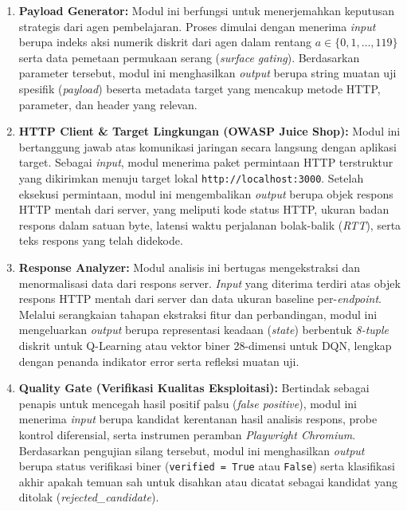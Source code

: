 \begin{enumerate}
\begin{enumerate}
    \item \textbf{Payload Generator:} 
    Modul ini berfungsi untuk menerjemahkan keputusan strategis dari agen pembelajaran. Proses dimulai dengan menerima \textit{input} berupa indeks aksi numerik diskrit dari agen dalam rentang $a \in \{0, 1, \dots, 119\}$ serta data pemetaan permukaan serang (\textit{surface gating}). Berdasarkan parameter tersebut, modul ini menghasilkan \textit{output} berupa string muatan uji spesifik (\textit{payload}) beserta metadata target yang mencakup metode HTTP, parameter, dan header yang relevan.

    \item \textbf{HTTP Client \& Target Lingkungan (OWASP Juice Shop):} 
    Modul ini bertanggung jawab atas komunikasi jaringan secara langsung dengan aplikasi target. Sebagai \textit{input}, modul menerima paket permintaan HTTP terstruktur yang dikirimkan menuju target lokal \texttt{http://localhost:3000}. Setelah eksekusi permintaan, modul ini mengembalikan \textit{output} berupa objek respons HTTP mentah dari server, yang meliputi kode status HTTP, ukuran badan respons dalam satuan byte, latensi waktu perjalanan bolak-balik (\textit{RTT}), serta teks respons yang telah didekode.

    \item \textbf{Response Analyzer:} 
    Modul analisis ini bertugas mengekstraksi dan menormalisasi data dari respons server. \textit{Input} yang diterima terdiri atas objek respons HTTP mentah dari server dan data ukuran baseline per-\textit{endpoint}. Melalui serangkaian tahapan ekstraksi fitur dan perbandingan, modul ini mengeluarkan \textit{output} berupa representasi keadaan (\textit{state}) berbentuk \textit{8-tuple} diskrit untuk Q-Learning atau vektor biner 28-dimensi untuk DQN, lengkap dengan penanda indikator error serta refleksi muatan uji.

    \item \textbf{Quality Gate (Verifikasi Kualitas Eksploitasi):} 
    Bertindak sebagai penapis untuk mencegah hasil positif palsu (\textit{false positive}), modul ini menerima \textit{input} berupa kandidat kerentanan hasil analisis respons, probe kontrol diferensial, serta instrumen peramban \textit{Playwright Chromium}. Berdasarkan pengujian silang tersebut, modul ini menghasilkan \textit{output} berupa status verifikasi biner (\texttt{verified = True} atau \texttt{False}) serta klasifikasi akhir apakah temuan sah untuk disahkan atau dicatat sebagai kandidat yang ditolak (\textit{rejected\_candidate}).


\end{enumerate}
\end{enumerate}
